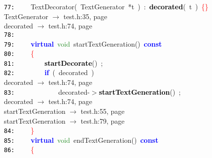 \documentclass{article}
\begin{document}
\mbox{}\texttt{\textcolor{Black}{77:}} \ \ \ \ \label{test.h:77}TextDecorator\textcolor{BrickRed}{(}\ TextGenerator\ \textcolor{BrickRed}{*}t\ \textcolor{BrickRed}{)}\ \textcolor{BrickRed}{:}\ \textbf{\textcolor{Black}{decorated}}\textcolor{BrickRed}{(}\ t\ \textcolor{BrickRed}{)}\ \textcolor{Red}{\{\}} \\
\mbox{}{\hfill TextGenerator $\rightarrow$ test.h:35, page~\pageref{test.h:35}} \\
\mbox{}{\hfill decorated $\rightarrow$ test.h:74, page~\pageref{test.h:74}} \\
\mbox{}\texttt{\textcolor{Black}{78:}}  \\
\mbox{}\texttt{\textcolor{Black}{79:}} \ \ \ \ \textbf{\textcolor{Blue}{virtual}}\ \textcolor{ForestGreen}{void}\ \label{test.h:79}startTextGeneration\textcolor{BrickRed}{()}\ \textbf{\textcolor{Blue}{const}}\  \\
\mbox{}\texttt{\textcolor{Black}{80:}} \ \ \ \ \textcolor{Red}{\{}\  \\
\mbox{}\texttt{\textcolor{Black}{81:}} \ \ \ \ \ \ \ \ \textbf{\textcolor{Black}{startDecorate}}\textcolor{BrickRed}{()}\ \textcolor{BrickRed}{;} \\
\mbox{}\texttt{\textcolor{Black}{82:}} \ \ \ \ \ \ \ \ \textbf{\textcolor{Blue}{if}}\ \textcolor{BrickRed}{(}\ decorated\ \textcolor{BrickRed}{)} \\
\mbox{}{\hfill decorated $\rightarrow$ test.h:74, page~\pageref{test.h:74}} \\
\mbox{}\texttt{\textcolor{Black}{83:}} \ \ \ \ \ \ \ \ \ \ \ \ decorated\textcolor{BrickRed}{-$>$}\textbf{\textcolor{Black}{startTextGeneration}}\textcolor{BrickRed}{()}\ \textcolor{BrickRed}{;} \\
\mbox{}{\hfill decorated $\rightarrow$ test.h:74, page~\pageref{test.h:74}} \\
\mbox{}{\hfill startTextGeneration $\rightarrow$ test.h:55, page~\pageref{test.h:55}} \\
\mbox{}{\hfill startTextGeneration $\rightarrow$ test.h:79, page~\pageref{test.h:79}} \\
\mbox{}\texttt{\textcolor{Black}{84:}} \ \ \ \ \textcolor{Red}{\}} \\
\mbox{}\texttt{\textcolor{Black}{85:}} \ \ \ \ \textbf{\textcolor{Blue}{virtual}}\ \textcolor{ForestGreen}{void}\ \label{test.h:85}endTextGeneration\textcolor{BrickRed}{()}\ \textbf{\textcolor{Blue}{const}}\  \\
\mbox{}\texttt{\textcolor{Black}{86:}} \ \ \ \ \textcolor{Red}{\{}\  \\
\end{document}

